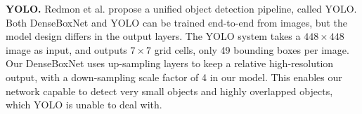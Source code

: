 \textbf{YOLO.}  Redmon et al.\cite{YOLO} propose a unified object detection pipeline, called YOLO. Both DenseBoxNet and YOLO can be trained end-to-end from images, but the model design differs in the output layers.  The YOLO system takes a $448 \times 448$ image as input, and outputs $7 \times 7$ grid cells, only 49 bounding boxes per image. Our DenseBoxNet uses up-sampling layers to keep a relative high-resolution output, with a down-sampling scale factor of 4 in our model. This enables our network capable to detect very small objects and highly overlapped objects, which YOLO is unable to deal with. 
 

